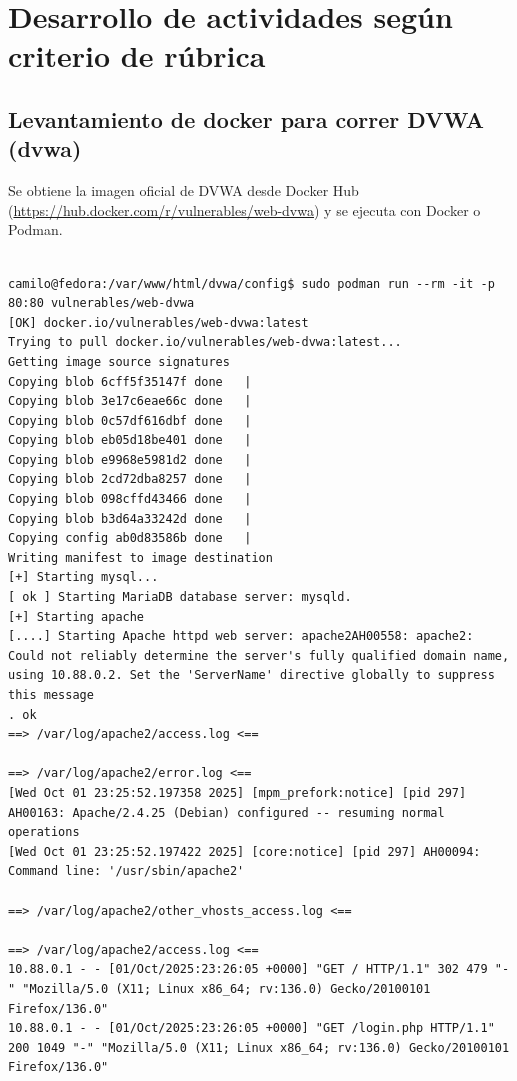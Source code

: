 \documentclass[letterpaper,12pt]{article}
\let\origsubsection\subsection
\renewcommand{\subsection}{\FloatBarrier\origsubsection}
\begin{document}
\section{Desarrollo de actividades según criterio de rúbrica}

\subsection{Levantamiento de docker para correr DVWA (dvwa)}
Se obtiene la imagen oficial de DVWA desde Docker Hub (\url{https://hub.docker.com/r/vulnerables/web-dvwa}) y se ejecuta con Docker o Podman.
\begin{verbatim}

camilo@fedora:/var/www/html/dvwa/config$ sudo podman run --rm -it -p 80:80 vulnerables/web-dvwa
[OK] docker.io/vulnerables/web-dvwa:latest
Trying to pull docker.io/vulnerables/web-dvwa:latest...
Getting image source signatures
Copying blob 6cff5f35147f done   | 
Copying blob 3e17c6eae66c done   | 
Copying blob 0c57df616dbf done   | 
Copying blob eb05d18be401 done   | 
Copying blob e9968e5981d2 done   | 
Copying blob 2cd72dba8257 done   | 
Copying blob 098cffd43466 done   | 
Copying blob b3d64a33242d done   | 
Copying config ab0d83586b done   | 
Writing manifest to image destination
[+] Starting mysql...
[ ok ] Starting MariaDB database server: mysqld.
[+] Starting apache
[....] Starting Apache httpd web server: apache2AH00558: apache2: Could not reliably determine the server's fully qualified domain name, using 10.88.0.2. Set the 'ServerName' directive globally to suppress this message
. ok 
==> /var/log/apache2/access.log <==

==> /var/log/apache2/error.log <==
[Wed Oct 01 23:25:52.197358 2025] [mpm_prefork:notice] [pid 297] AH00163: Apache/2.4.25 (Debian) configured -- resuming normal operations
[Wed Oct 01 23:25:52.197422 2025] [core:notice] [pid 297] AH00094: Command line: '/usr/sbin/apache2'

==> /var/log/apache2/other_vhosts_access.log <==

==> /var/log/apache2/access.log <==
10.88.0.1 - - [01/Oct/2025:23:26:05 +0000] "GET / HTTP/1.1" 302 479 "-" "Mozilla/5.0 (X11; Linux x86_64; rv:136.0) Gecko/20100101 Firefox/136.0"
10.88.0.1 - - [01/Oct/2025:23:26:05 +0000] "GET /login.php HTTP/1.1" 200 1049 "-" "Mozilla/5.0 (X11; Linux x86_64; rv:136.0) Gecko/20100101 Firefox/136.0"

\end{verbatim}
\end{document}
